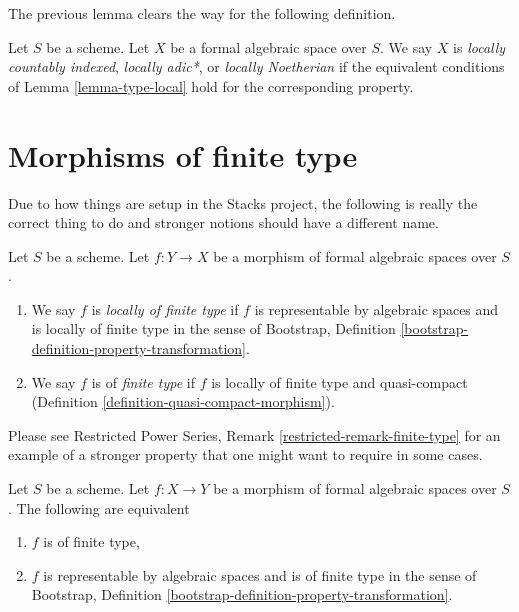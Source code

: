 \noindent
The previous lemma clears the way for the following definition.

\begin{definition}
\label{definition-types-formal-algebraic-spaces}
Let $S$ be a scheme. Let $X$ be a formal algebraic space over $S$.
We say $X$ is {\it locally countably indexed},
{\it locally adic*}, or {\it locally Noetherian}
if the equivalent conditions of Lemma \ref{lemma-type-local}
hold for the corresponding property.
\end{definition}






\section{Morphisms of finite type}
\label{section-finite-type}

\noindent
Due to how things are setup in the Stacks project, the following
is really the correct thing to do and stronger notions should have
a different name.

\begin{definition}
\label{definition-finite-type}
Let $S$ be a scheme. Let $f : Y \to X$ be a morphism of formal algebraic
spaces over $S$.
\begin{enumerate}
\item We say $f$ is {\it locally of finite type}
if $f$ is representable by algebraic spaces and is locally
of finite type in the sense of
Bootstrap, Definition \ref{bootstrap-definition-property-transformation}.
\item We say $f$ is of {\it finite type} if $f$ is locally of finite type and
quasi-compact (Definition \ref{definition-quasi-compact-morphism}).
\end{enumerate}
\end{definition}

\noindent
Please see Restricted Power Series, Remark \ref{restricted-remark-finite-type}
for an example of a stronger property that one might
want to require in some cases.

\begin{lemma}
\label{lemma-characterize-finite-type}
Let $S$ be a scheme. Let $f : X \to Y$ be a morphism of formal algebraic
spaces over $S$. The following are equivalent
\begin{enumerate}
\item $f$ is of finite type,
\item $f$ is representable by algebraic spaces and is of finite type in
the sense of
Bootstrap, Definition \ref{bootstrap-definition-property-transformation}.
\end{enumerate}
\end{lemma}

